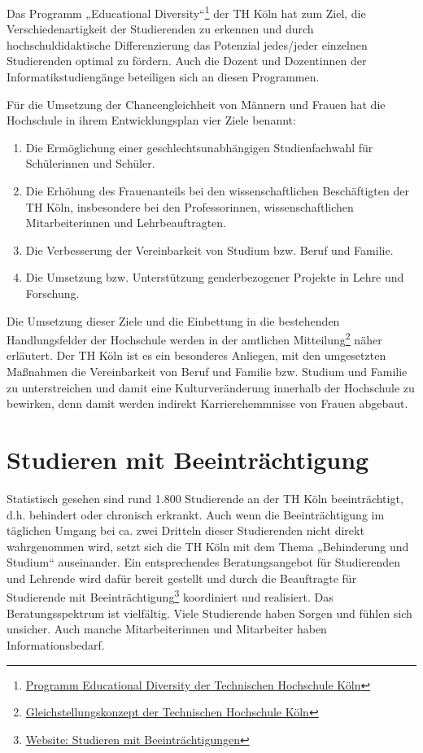 Das Programm „Educational Diversity``\footnote{\href{https://www.th-koeln.de/hochschule/educational-diversity_5710.php}{Programm
  Educational Diversity der Technischen Hochschule Köln}} der TH Köln
hat zum Ziel, die Verschiedenartigkeit der Studierenden zu erkennen und
durch hochschuldidaktische Differenzierung das Potenzial jedes/jeder
einzelnen Studierenden optimal zu fördern. Auch die Dozent und
Dozentinnen der Informatikstudiengänge beteiligen sich an diesen
Programmen.

Für die Umsetzung der Chancengleichheit von Männern und Frauen hat die
Hochschule in ihrem Entwicklungsplan vier Ziele benannt:

\begin{enumerate}
\def\labelenumi{\arabic{enumi}.}
\tightlist
\item
  Die Ermöglichung einer geschlechtsunabhängigen Studienfachwahl für
  Schülerinnen und Schüler.
\item
  Die Erhöhung des Frauenanteils bei den wissenschaftlichen
  Beschäftigten der TH Köln, insbesondere bei den Professorinnen,
  wissenschaftlichen Mitarbeiterinnen und Lehrbeauftragten.
\item
  Die Verbesserung der Vereinbarkeit von Studium bzw. Beruf und Familie.
\item
  Die Umsetzung bzw. Unterstützung genderbezogener Projekte in Lehre und
  Forschung.
\end{enumerate}

Die Umsetzung dieser Ziele und die Einbettung in die bestehenden
Handlungsfelder der Hochschule werden in der amtlichen
Mitteilung\footnote{\href{http://www.fh-koeln.de/mam/downloads/deutsch/hochschule/profil/gleichstellung/gleichstellungskonzept.pdf}{Gleichstellungskonzept
  der Technischen Hochschule Köln}} näher erläutert. Der TH Köln ist es
ein besonderes Anliegen, mit den umgesetzten Maßnahmen die Vereinbarkeit
von Beruf und Familie bzw. Studium und Familie zu unterstreichen und
damit eine Kulturveränderung innerhalb der Hochschule zu bewirken, denn
damit werden indirekt Karrierehemmnisse von Frauen abgebaut.

\section{Studieren mit
Beeinträchtigung}\label{studieren-mit-beeintruxe4chtigung}

Statistisch gesehen sind rund 1.800 Studierende an der TH Köln
beeinträchtigt, d.h. behindert oder chronisch erkrankt. Auch wenn die
Beeinträchtigung im täglichen Umgang bei ca. zwei Dritteln dieser
Studierenden nicht direkt wahrgenommen wird, setzt sich die TH Köln mit
dem Thema „Behinderung und Studium`` auseinander. Ein entsprechendes
Beratungsangebot für Studierenden und Lehrende wird dafür bereit
gestellt und durch die Beauftragte für Studierende mit
Beeinträchtigung\footnote{\href{https://www.th-koeln.de/studium/studieren-mit-beeintraechtigung_169.php}{Website:
  Studieren mit Beeinträchtigungen}} koordiniert und realisiert. Das
Beratungsspektrum ist vielfältig. Viele Studierende haben Sorgen und
fühlen sich unsicher. Auch manche Mitarbeiterinnen und Mitarbeiter haben
Informationsbedarf.

